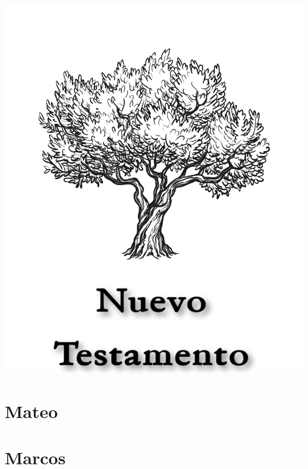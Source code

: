 \null\vfill
\begin{center}
\begin{minipage}[c]{\textwidth}
  \begin{center}
  \includegraphics{NuevoTestamentoTitulo.pdf}
  \end{center}
\end{minipage}
\end{center}
\null\vfill
\newpage

\pagestyle{bible}

\chapter{Mateo}
\begin{multicols}{2}
  \parskip=0pt \relax
  
\end{multicols}

\chapter{Marcos}
\begin{multicols}{2}
  \parskip=0pt \relax
  
\end{multicols}


